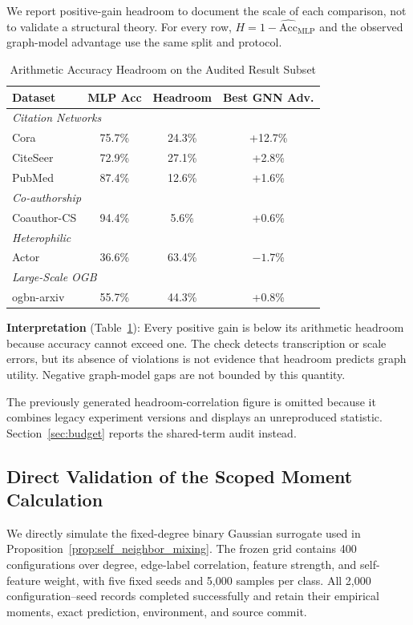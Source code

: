 We report positive-gain headroom to document the scale of each comparison, not to validate a structural theory. For every row, $H=1-\widehat{\mathrm{Acc}}_{\mathrm{MLP}}$ and the observed graph-model advantage use the same split and protocol.

\begin{table}[t]
\centering
\caption{Arithmetic Accuracy Headroom on the Audited Result Subset}
\label{tab:budget_validation}
\small
\begin{tabular}{@{}lccc@{}}
\toprule
Dataset & MLP Acc & Headroom & Best GNN Adv. \\
\midrule
\multicolumn{4}{l}{\textit{Citation Networks}} \\
Cora & 75.7\% & 24.3\% & +12.7\% \\
CiteSeer & 72.9\% & 27.1\% & +2.8\% \\
PubMed & 87.4\% & 12.6\% & +1.6\% \\
\midrule
\multicolumn{4}{l}{\textit{Co-authorship}} \\
Coauthor-CS & 94.4\% & 5.6\% & +0.6\% \\
\midrule
\multicolumn{4}{l}{\textit{Heterophilic}} \\
Actor & 36.6\% & 63.4\% & $-1.7$\% \\
\midrule
\multicolumn{4}{l}{\textit{Large-Scale OGB}} \\
ogbn-arxiv & 55.7\% & 44.3\% & +0.8\% \\
\bottomrule
\end{tabular}
\end{table}

\textbf{Interpretation} (Table~\ref{tab:budget_validation}): Every positive gain is below its arithmetic headroom because accuracy cannot exceed one. The check detects transcription or scale errors, but its absence of violations is not evidence that headroom predicts graph utility. Negative graph-model gaps are not bounded by this quantity.

The previously generated headroom-correlation figure is omitted because it combines legacy experiment versions and displays an unreproduced statistic. Section~\ref{sec:budget} reports the shared-term audit instead.

\subsection{Direct Validation of the Scoped Moment Calculation}

We directly simulate the fixed-degree binary Gaussian surrogate used in Proposition~\ref{prop:self_neighbor_mixing}. The frozen grid contains 400 configurations over degree, edge-label correlation, feature strength, and self-feature weight, with five fixed seeds and 5,000 samples per class. All 2,000 configuration--seed records completed successfully and retain their empirical moments, exact prediction, environment, and source commit.

